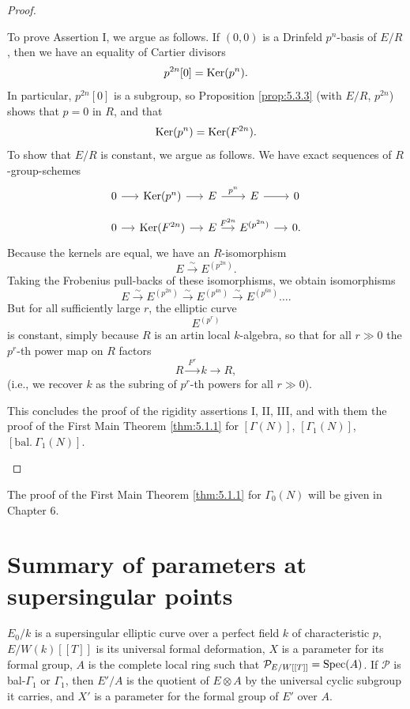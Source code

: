 \begin{proof}
\begin{pitem}\label{lem:5.3.6}
To prove Assertion I, we argue as follows. If $(0,0)$ is a Drinfeld $p^n$-basis of $E/R$, then we have an equality of Cartier divisors
\[
p^{2n}[0] = \operatorname{Ker}(p^n).
\]
In particular, $p^{2n}[0]$ is a subgroup, so Proposition \ref{prop:5.3.3} (with $E/R$, $p^{2n}$) shows that $p = 0$ in $R$, and that
\[
\operatorname{Ker}(p^n) = \operatorname{Ker}(F^{2n}).
\]
To show that $E/R$ is constant, we argue as follows. We have exact sequences of $R$-group-schemes
\[
\begin{tikzcd}[row sep=small, column sep=small]
0 \arrow[r] & \Ker(p^n) \arrow[r] & E \arrow[r, "p^n"] & E \arrow[r] & 0 \\
0 \arrow[r] & \Ker(F^{2n}) \arrow[r] & E \arrow[r, "F^{2n}"] & E^{(p^{2n})} \arrow[r] & 0.
\end{tikzcd}
\]
Because the kernels are equal, we have an $R$-isomorphism
\[
E \xrightarrow{\ \sim\ } E^{(p^{2n})}.
\]
Taking the Frobenius pull-backs of these isomorphisms, we obtain isomorphisms
\[
E \xrightarrow{\ \sim\ } E^{(p^{2n})} \xrightarrow{\ \sim\ } E^{(p^{4n})} \xrightarrow{\ \sim\ } E^{(p^{6n})} \ldots .
\]
But for all sufficiently large $r$, the elliptic curve
\[
E^{(p^r)}
\]
is constant, simply because $R$ is an artin local $k$-algebra, so that for all $r \gg 0$ the $p^r$-th power map on $R$ factors
\[
R \xrightarrow{\ F^r\ } k \longrightarrow R,
\]
(i.e., we recover $k$ as the subring of $p^r$-th powers for all $r \gg 0$).

This concludes the proof of the rigidity assertions I, II, III, and with them the proof of the First Main Theorem \ref{thm:5.1.1} for $[\Gamma(N)]$, $[\Gamma_1(N)]$, $[\mathrm{bal.}\ \Gamma_1(N)]$.
\end{pitem}
\end{proof}

The proof of the First Main Theorem \ref{thm:5.1.1} for $\Gamma_0(N)$ will be given in Chapter 6.

\section{Summary of parameters at supersingular points}
\label{sec:5.4}

$E_0/k$ is a supersingular elliptic curve over a perfect field $k$ of characteristic $p$, $E/W(k)[[T]]$ is its universal formal deformation, $X$ is a parameter for its formal group, $A$ is the complete local ring such that $\mathcal{P}_{E/W[[T]]} = \operatorname{Spec}(A)$. If $\mathcal{P}$ is bal-$\Gamma_1$ or $\Gamma_1$, then $E'/A$ is the quotient of $E\otimes A$ by the universal cyclic subgroup it carries, and $X'$ is a parameter for the formal group of $E'$ over $A$.

